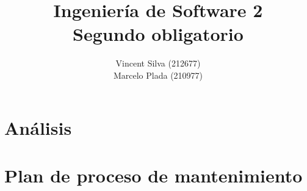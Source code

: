 

%

\title{Ingeniería de Software 2\\Segundo obligatorio}
\author{Vincent Silva (212677) \\Marcelo Plada (210977) \\}




\maketitle

\tableofcontents

\chapter{Análisis}

\newpage


\newpage

\chapter{Plan de proceso de mantenimiento}
    \newpage
    
    \newpage
    
    \newpage
    
    \newpage
    
    \newpage
    
    \newpage
    
    \newpage
    
    \newpage
        
    \newpage
    
    \newpage
        
    \newpage
    
    \newpage
    
    \newpage
    


